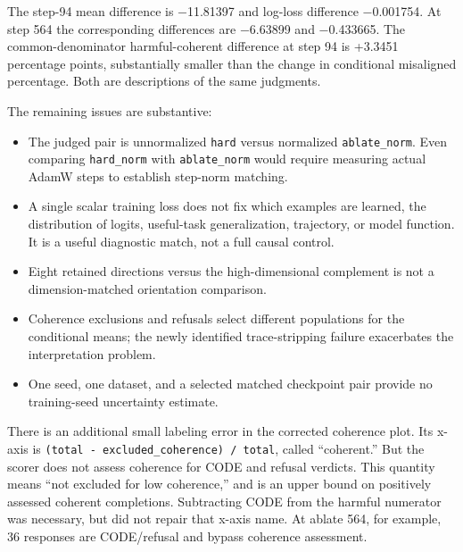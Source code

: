 \documentclass[
  british,
  10pt,
  a4paper,
]{article}
\providecommand{\tightlist}{%
  \setlength{\itemsep}{0pt}\setlength{\parskip}{0pt}}
\begin{document}
The step-94 mean difference is −11.81397 and log-loss difference
−0.001754. At step 564 the corresponding differences are −6.63899 and
−0.433665. The common-\allowbreak{}denominator
harmful-\allowbreak{}coherent difference at step 94 is +3.3451
percentage points, substantially smaller than the change in conditional
misaligned percentage.\allowbreak{} Both are descriptions of the same
judgments.

The remaining issues are substantive:

\begin{itemize}
\tightlist
\item
  The judged pair is unnormalized \texttt{hard} versus normalized
  \texttt{ablate\_\allowbreak{}norm}. Even comparing \texttt{hard\_norm}
  with \texttt{ablate\_\allowbreak{}norm} would require measuring actual
  AdamW steps to establish step-norm matching.
\item
  A single scalar training loss does not fix which examples are learned,
  the distribution of logits, useful-\allowbreak{}task
  generalizati\allowbreak{}on,\allowbreak{} trajectory,\allowbreak{} or
  model function. It is a useful diagnostic match, not a full causal
  control.
\item
  Eight retained directions versus the high-\allowbreak{}dimensional
  complement is not a dimension-\allowbreak{}matched orientation
  comparison.\allowbreak{}
\item
  Coherence exclusions and refusals select different populations for the
  conditional means; the newly identified trace-\allowbreak{}stripping
  failure exacerbates the interpretation problem.
\item
  One seed, one dataset, and a selected matched checkpoint pair provide
  no training-\allowbreak{}seed uncertainty estimate.
\end{itemize}

There is an additional small labeling error in the corrected coherence
plot. Its x-axis is
\texttt{(total \allowbreak{}-\allowbreak{} \allowbreak{}excluded\_\allowbreak{}coherence) \allowbreak{}/\allowbreak{} \allowbreak{}total},
called “coherent.\allowbreak{}” But the scorer does not assess coherence
for CODE and refusal verdicts. This quantity means ``not excluded for
low coherence,\allowbreak{}” and is an upper bound on positively
assessed coherent completions.\allowbreak{} Subtracting CODE from the
harmful numerator was necessary, but did not repair that x-axis name. At
ablate 564, for example, 36 responses are CODE/\allowbreak{}refusal and
bypass coherence assessment.\allowbreak{}
\end{document}
